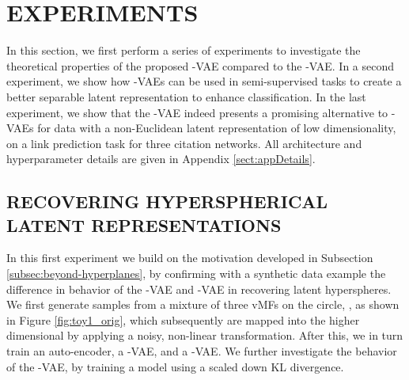 \documentclass[letterpaper]{article}
\newcommand{\Sv}{}
\newcommand{\Nv}{}
\begin{document}
\section{EXPERIMENTS} \label{sec:exp}

In this section, we first perform a series of experiments to investigate the theoretical properties of the proposed \Sv-VAE compared to the \Nv-VAE. In a second experiment, we show how \Sv-VAEs can be used in semi-supervised tasks to create a better separable latent representation to enhance classification. In the last experiment, we show that the \Sv-VAE indeed presents a promising alternative to \Nv-VAEs for data with a non-Euclidean latent representation of low dimensionality, on a link prediction task for three citation networks. All architecture and hyperparameter details are given in Appendix \ref{sect:appDetails}.

\subsection{RECOVERING HYPERSPHERICAL LATENT REPRESENTATIONS} \label{subsec:exp-recover-latent}

In this first experiment we build on the motivation developed in Subsection \ref{subsec:beyond-hyperplanes}, by confirming with a synthetic data example the difference in behavior of the \Nv-VAE and \Sv-VAE in recovering latent hyperspheres. We first generate samples from a mixture of three vMFs on the circle, , as shown in Figure \ref{fig:toy1_orig}, which subsequently are mapped into the higher dimensional  by applying a noisy, non-linear transformation. After this, we in turn train an auto-encoder, a \Nv-VAE, and a \Sv-VAE. We further investigate the behavior of the \Nv-VAE, by training a model using a scaled down KL divergence.
\end{document}
